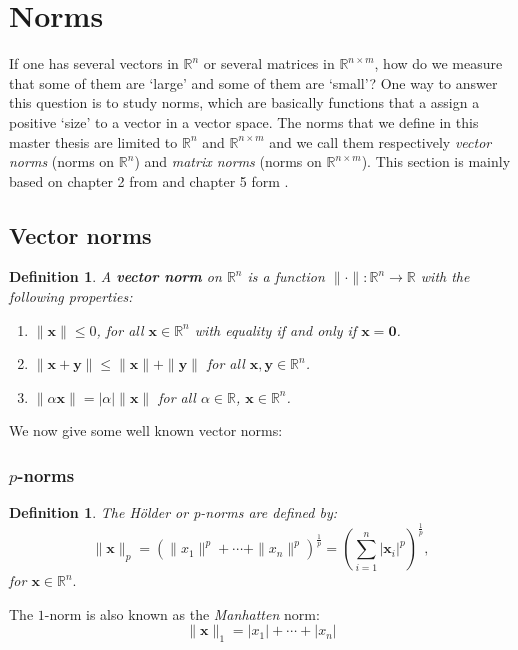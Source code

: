 \documentclass[a4paper,11pt]{report}
\newtheorem{definition}[theorem]{Definition}
\newcommand{\R}{{\mathbb R}}
\begin{document}
\section{Norms}
If one has several vectors in $\R^n$ or several matrices in $\R^{n\times m}$, 
how do we measure that some of them are `large' and some of them are `small'? 
One way to answer this question is to study norms, which are basically functions 
that a assign a positive `size' to a vector in a vector space. The norms that we define 
in this master thesis are limited to $\R^n$ and $\R^{n\times m}$ and we call 
them respectively \emph{vector norms} (norms on $\R^n$) and \emph{matrix norms} (norms on $\R^{n\times 
m}$). This section is mainly based on chapter 2 from \cite{golub} and chapter 5 
form \cite{horn}.

\subsection{Vector norms}
\begin{definition}
  A \textbf{vector norm} on $\R^n$ is a function $\|\cdot\|: \R^n \to \R$ with 
  the following properties:
  \begin{enumerate}
 \item $\|\mathbf{x}\| \leq 0$, for all $\mathbf{x} \in \R^n$ with equality if 
 and only if $\mathbf{x} = \mathbf{0}$.
 \item $\|\mathbf{x} + \mathbf{y}\| \leq \|\mathbf{x}\| + \|\mathbf{y}\|$ for 
 all $\mathbf{x},\mathbf{y} \in \R^n$.
 \item $\|\alpha \mathbf{x}\| = |\alpha|\|\mathbf{x}\|$ for all $\alpha \in \R$, $\mathbf{x} \in 
 \R^n$.
  \end{enumerate}
\end{definition}



We now give some well known vector norms:
\subsubsection{$p$-norms}
\begin{definition}
  The \textit{H\"{o}lder} or  \emph{p-norms} are defined by:
  $$\|\mathbf{x}\|_p = (\|x_1\|^p+\cdots + \|x_n\|^p)^{\frac{1}{p}} = \left(\sum_{i=1}^n |\mathbf{x}_i|^p\right)^{\frac{1}{p}},$$
  for $\mathbf{x} \in \R^n.$
\end{definition}
The $1$-norm is also known as the \emph{Manhatten} norm:
$$\|\mathbf{x}\|_1 = |x_1|+  \cdots + |x_n|$$
\end{document}
